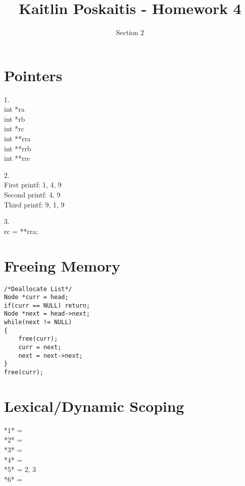 \documentclass[11pt]{article}
\title{\bf Kaitlin Poskaitis - Homework 4}
\author{Section 2}
\date{}
\begin{document}
\maketitle

\section{Pointers}

1.\\  
\indent\indent int *ra \\
\indent\indent int *rb \\
\indent\indent int *rc \\
\indent\indent int **rra \\
\indent\indent int **rrb\\
\indent\indent int **rrc

2.\\ 
\indent\indent First printf: 1, 4, 9\\
\indent\indent Second printf: 4, 9\\
\indent\indent Third printf: 9, 1, 9


3.\\
\indent\indent rc = **rra;

\section{Freeing Memory}

\begin{lstlisting}
/*Deallocate List*/
Node *curr = head;
if(curr == NULL) return;
Node *next = head->next;
while(next != NULL)
{
	free(curr);
	curr = next;
	next = next->next;
}
free(curr);

\end{lstlisting}

\section{Lexical/Dynamic Scoping}

*1* = \\
*2* = \\
*3* = \\
*4* = \\
*5* = 2, 3 \\
*6* = \\
\end{document}
